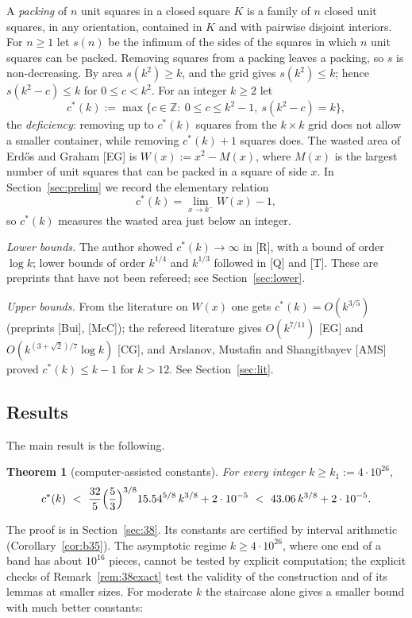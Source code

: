 \documentclass[11pt]{amsart}
\newcommand{\Z}{\mathbb Z}
\newcommand{\cs}{c^{*}}
\newtheorem{theorem}{Theorem}[section]
\theoremstyle{definition}
\theoremstyle{remark}
\numberwithin{equation}{section}
\begin{document}
A \emph{packing} of $n$ unit squares in a closed square $K$ is a family of $n$ closed unit squares, in any orientation,
contained in $K$ and with pairwise disjoint interiors. For $n\ge1$ let $s(n)$ be the infimum of the sides of the squares
in which $n$ unit squares can be packed. Removing squares from a packing leaves a packing, so $s$ is non-decreasing.
By area $s(k^2)\ge k$, and the grid gives $s(k^2)\le k$; hence $s(k^2-c)\le k$ for $0\le c<k^2$. For an integer $k\ge2$
let
\[
\cs(k):=\max\{c\in\Z:\ 0\le c\le k^2-1,\ s(k^2-c)=k\},
\]
the \emph{deficiency}: removing up to $\cs(k)$ squares from the $k\times k$ grid does not allow a smaller container,
while removing $\cs(k)+1$ squares does. The wasted area of Erd\H{o}s and Graham [EG] is $W(x):=x^2-M(x)$, where $M(x)$ is
the largest number of unit squares that can be packed in a square of side $x$. In Section~\ref{sec:prelim} we record
the elementary relation
\begin{equation}\label{eq:translation}
\cs(k)=\lim_{x\to k^-}W(x)-1 ,
\end{equation}
so $\cs(k)$ measures the wasted area just below an integer.

\emph{Lower bounds.} The author showed $\cs(k)\to\infty$ in [R], with a bound of order $\log k$; lower bounds of
order $k^{1/4}$ and $k^{1/3}$ followed in [Q] and [T]. These are preprints that have not been refereed; see
Section~\ref{sec:lower}.

\emph{Upper bounds.} From the literature on $W(x)$ one gets $\cs(k)=O(k^{3/5})$ (preprints [Bui], [McC]); the refereed
literature gives $O(k^{7/11})$ [EG] and $O(k^{(3+\sqrt2)/7}\log k)$ [CG], and Arslanov, Mustafin and Shangitbayev
[AMS] proved $\cs(k)\le k-1$ for $k>12$. See Section~\ref{sec:lit}.

\subsection{Results}
The main result is the following.

\begin{theorem}[computer-assisted constants]\label{thm:main38}
For every integer $k\ge k_1:=4\cdot10^{26}$,
\[
\cs(k)\ <\ \frac{32}{5}\Bigl(\frac53\Bigr)^{3/8}15.54^{5/8}\,k^{3/8}+2\cdot10^{-5}
\ <\ 43.06\,k^{3/8}+2\cdot10^{-5} .
\]
\end{theorem}

The proof is in Section~\ref{sec:38}. Its constants are certified by interval arithmetic (Corollary~\ref{cor:b35}).
The asymptotic regime $k\ge4\cdot10^{26}$, where one end of a band has about $10^{16}$ pieces, cannot be tested by
explicit computation; the explicit checks of Remark~\ref{rem:38exact} test the validity of the construction and of its
lemmas at smaller sizes. For moderate $k$ the staircase alone gives a smaller bound with much better constants:
\end{document}
